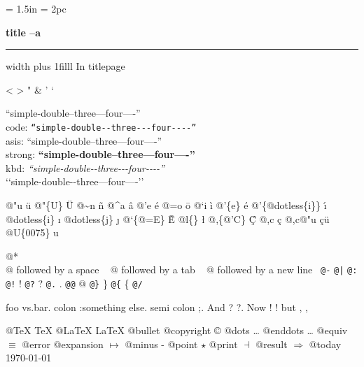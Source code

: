 \documentclass{book}
\newcommand\GNUTexinfofrontmatter{\frontmatter}
\begin{document}
\GNUTexinfofrontmatter
\begin{titlepage}
\begingroup
\newskip\titlepagetopglue \titlepagetopglue = 1.5in
\newskip\titlepagebottomglue \titlepagebottomglue = 2pc
\setlength{\parindent}{0pt}
    \vglue\titlepagetopglue
{\raggedright {\huge \bfseries title --a}}
\vskip 4pt \hrule height 4pt width \hsize \vskip 4pt
\vskip 0pt plus 1filll
%
%
In titlepage

<
>
"
\&
'
`

``simple-double--three---four----''\leavevmode{}\\
code: \texttt{``simple-double{-}{-}three{-}{-}{-}four{-}{-}{-}-''} \leavevmode{}\\
asis: ``simple-double--three---four----'' \leavevmode{}\\
strong: \textbf{``simple-double--three---four----''} \leavevmode{}\\
kbd: {\ttfamily\textsl{``simple-double{-}{-}three{-}{-}{-}four{-}{-}{-}-''}} \leavevmode{}\\

`\hbox{}`simple-double-\hbox{}-three---four----'\hbox{}'\leavevmode{}\\

%
%
%
%

@"u \"{u} 
@"\{U\} \"{U} 
@\~{}n \~{n}
@\^{}a \^{a}
@'e \'{e}
@=o \={o}
@`i \`{i}
@'\{e\} \'{e}
@'\{@dotless\{i\}\} \'{\i{}} 
@dotless\{i\} \i{}
@dotless\{j\} \j{}
@`\{@=E\} \`{\={E}} 
@l\{\} \l{}
@,\{@'C\} \c{\'{C}}
@,c \c{c}
@,c@"u \c{c}\"{u} \leavevmode{}\\

@U\{0075\} u

@* \leavevmode{}\\
@ followed by a space
\ {}
@ followed by a tab
\ {}
@ followed by a new line
\ {}\texttt{@-} \-{}
\texttt{@|} 
\texttt{@:} \@
\texttt{@!} \@!
\texttt{@?} \@?
\texttt{@.} \@.
\texttt{@@} @
\texttt{@\}} \}
\texttt{@\{} \{
\texttt{@/} 

foo vs.\@ bar. 
colon :\@And something else.
semi colon ;\@.
And ? ?\@.
Now ! !\@@
but , ,\@

@TeX \TeX{}
@LaTeX \LaTeX{}
@bullet \textbullet{}
@copyright \copyright{}
@dots \dots{}\@
@enddots \dots{}
@equiv $\equiv{}$
@error 
@expansion $\mapsto{}$
@minus -
@point $\star{}$
@print $\dashv{}$
@result $\Rightarrow{}$
@today \today{}


\end{titlepage}
\end{document}
